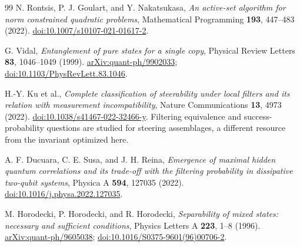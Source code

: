 \documentclass[11pt]{article}
\theoremstyle{remark}\newtheorem{remark}[theorem]{Remark}
\begin{document}
\begin{thebibliography}{99}
N. Rontsis, P. J. Goulart, and Y. Nakatsukasa,
\emph{An active-set algorithm for norm constrained quadratic problems},
Mathematical Programming \textbf{193}, 447--483 (2022).
\href{https://doi.org/10.1007/s10107-021-01617-2}{doi:10.1007/s10107-021-01617-2}.

G. Vidal, \emph{Entanglement of pure states for a single copy},
Physical Review Letters \textbf{83}, 1046--1049 (1999).
\href{https://arxiv.org/abs/quant-ph/9902033}{arXiv:quant-ph/9902033};
\href{https://doi.org/10.1103/PhysRevLett.83.1046}{doi:10.1103/PhysRevLett.83.1046}.

H.-Y. Ku et al., \emph{Complete classification of steerability under local
filters and its relation with measurement incompatibility},
Nature Communications \textbf{13}, 4973 (2022).
\href{https://doi.org/10.1038/s41467-022-32466-y}{doi:10.1038/s41467-022-32466-y}.
Filtering equivalence and success-probability questions are studied for
steering assemblages, a different resource from the invariant optimized here.

A. F. Ducuara, C. E. Susa, and J. H. Reina,
\emph{Emergence of maximal hidden quantum correlations and its trade-off
with the filtering probability in dissipative two-qubit systems},
Physica A \textbf{594}, 127035 (2022).
\href{https://doi.org/10.1016/j.physa.2022.127035}{doi:10.1016/j.physa.2022.127035}.

M. Horodecki, P. Horodecki, and R. Horodecki,
\emph{Separability of mixed states: necessary and sufficient conditions},
Physics Letters A \textbf{223}, 1--8 (1996).
\href{https://arxiv.org/abs/quant-ph/9605038}{arXiv:quant-ph/9605038};
\href{https://doi.org/10.1016/S0375-9601(96)00706-2}{doi:10.1016/S0375-9601(96)00706-2}.

\end{thebibliography}
\end{document}
